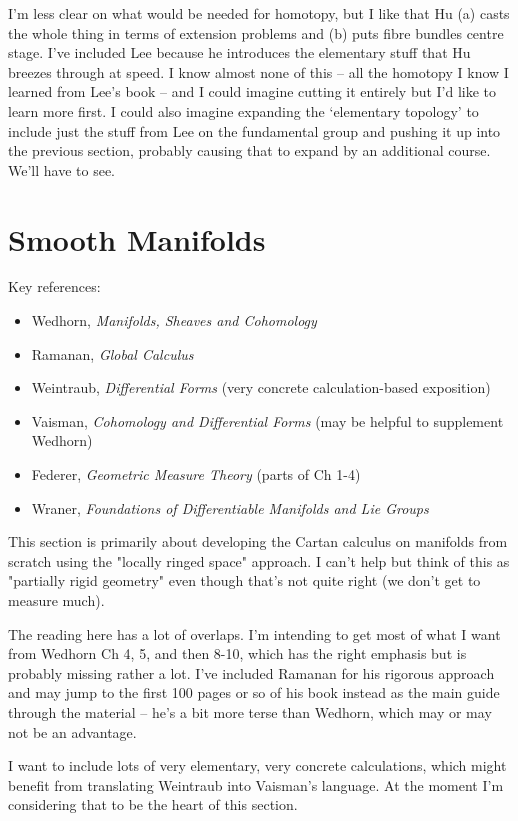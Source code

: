 \documentclass[article]{article}
\begin{document}
I'm less clear on what would be needed for homotopy, but I like that Hu (a) casts the whole thing in terms of extension problems and (b) puts fibre bundles centre stage. I've included Lee because he introduces the elementary stuff that Hu breezes through at speed. I know almost none of this -- all the homotopy I know I learned from Lee's book -- and I could imagine cutting it entirely but I'd like to learn more first. I could also imagine expanding the `elementary topology' to include just the stuff from Lee on the fundamental group and pushing it up into the previous section, probably causing that to expand by an additional course. We'll have to see.

\section{Smooth Manifolds}

Key references:
\begin{itemize}
	\item{Wedhorn, \textit{Manifolds, Sheaves and Cohomology}}
	\item{Ramanan, \textit{Global Calculus}}
	\item{Weintraub, \textit{Differential Forms} (very concrete calculation-based exposition)}
	\item{Vaisman, \textit{Cohomology and Differential Forms} (may be helpful to supplement Wedhorn)}
	\item{Federer, \textit{Geometric Measure Theory} (parts of Ch 1-4)}
	\item{Wraner, \textit{Foundations of Differentiable Manifolds and Lie Groups}}
\end{itemize}

This section is primarily about developing the Cartan calculus on manifolds from scratch using the "locally ringed space" approach. I can't help but think of this as "partially rigid geometry" even though that's not quite right (we don't get to measure much).

The reading here has a lot of overlaps. I'm intending to get most of what I want from Wedhorn Ch 4, 5, and then 8-10, which has the right emphasis but is probably missing rather a lot. I've included Ramanan for his rigorous approach and may jump to the first 100 pages or so of his book instead as the main guide through the material -- he's a bit more terse than Wedhorn, which may or may not be an advantage.

I want to include lots of very elementary, very concrete calculations, which might benefit from translating Weintraub into Vaisman's language. At the moment I'm considering that to be the heart of this section.
\end{document}
